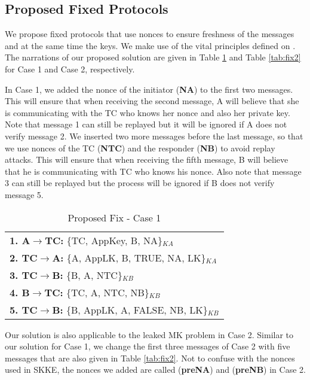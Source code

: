 \subsection{Proposed Fixed Protocols}
\label{fix}
We propose fixed protocols that use nonces to ensure freshness of the messages and at the same time the keys. 
We make use of the vital principles defined on \cite{Abadi:Needham}. 
The narrations of our proposed solution are given in Table \ref{tab:fix1} and Table \ref{tab:fix2} for Case 1 and Case 2, respectively.

In Case 1, we added the nonce of the initiator (\textbf{NA}) to the first two messages. 
This will ensure that when receiving the second message, A will believe that she is communicating with the TC who knows her nonce and also her private key. 
Note that message 1 can still be replayed but it will be ignored if A does not verify message 2. 
We inserted two more messages before the last message, so that we use nonces of the TC (\textbf{NTC}) and the responder (\textbf{NB}) to avoid replay attacks.
This will ensure that when receiving the fifth message, B will believe that he is communicating with TC who knows his nonce.
Also note that message 3 can still be replayed but the process will be ignored if B does not verify message 5. 

\begin{table}\caption{Proposed Fix - Case 1}
\label{tab:fix1}
\centering
\begin{tabular}{l}
\hline
\textbf{1. A\(\rightarrow\)TC:} \{TC, AppKey, B, NA\}$_{KA}$   \\
\textbf{2. TC\(\rightarrow\)A:} \{A, AppLK, B, TRUE, NA, LK\}$_{KA}$  \\
\textbf{3. TC\(\rightarrow\)B:} \{B, A, NTC\}$_{KB}$  \\
\textbf{4. B\(\rightarrow\)TC:} \{TC, A, NTC, NB\}$_{KB}$  \\
\textbf{5. TC\(\rightarrow\)B:} \{B, AppLK, A, FALSE, NB, LK\}$_{KB}$  \\
\hline
\end{tabular}
\end{table}
Our solution is also applicable to the leaked MK problem in Case 2. 
Similar to our solution for Case 1, we change the first three messages of Case 2 with five messages that are also given in Table \ref{tab:fix2}.
Not to confuse with the nonces used in SKKE, the nonces we added are called (\textbf{preNA}) and (\textbf{preNB}) in Case 2.

